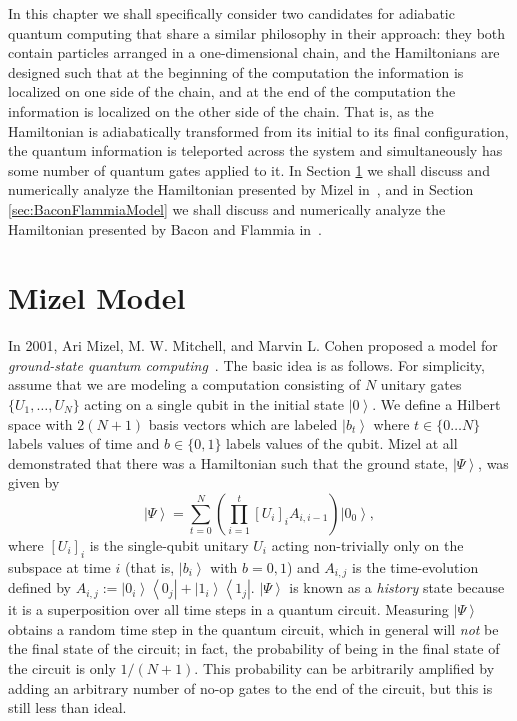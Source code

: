 \documentclass[12pt]{amsbook}
\theoremstyle{plain}
\theoremstyle{definition}
\theoremstyle{remark}
\newcommand{\ket}[1]{\left|#1\right>}
\newcommand{\bra}[1]{\left<#1\right|}
\newcommand{\ketbra}[2]{\ket{#1}\!\!\bra{#2}}
\newcommand{\paren}[1]{\left(#1\right)}
\begin{document}
In this chapter we shall specifically consider two candidates for adiabatic quantum computing that share a similar philosophy in their approach:  they both contain particles arranged in a one-dimensional chain, and the Hamiltonians are designed such that at the beginning of the computation the information is localized on one side of the chain, and at the end of the computation the information is localized on the other side of the chain.  That is, as the Hamiltonian is adiabatically transformed from its initial to its final configuration, the quantum information is teleported across the system and simultaneously has some number of quantum gates applied to it.  In Section \ref{sec:MizelModel} we shall discuss and numerically analyze the Hamiltonian presented by Mizel in~\cite{Mizel2010}, and in Section \ref{sec:BaconFlammiaModel} we shall discuss and numerically analyze the Hamiltonian presented by Bacon and Flammia in~\cite{Bacon2009}.
\section{Mizel Model}
\label{sec:MizelModel}

In 2001, Ari Mizel, M. W. Mitchell, and Marvin L. Cohen proposed a model for \emph{ground-state quantum computing}~\cite{PhysRevA.63.040302}.  The basic idea is as follows.  For simplicity, assume that we are modeling a computation consisting of $N$ unitary gates $\{U_1,\dots,U_N\}$ acting on a single qubit in the initial state $\ket{0}$.  We define a Hilbert space with $2(N+1)$ basis vectors which are labeled $\ket{b_t}$ where $t\in\{0\dots N\}$ labels values of time and $b\in\{0,1\}$ labels values of the qubit.  Mizel at all demonstrated that there was a Hamiltonian such that the ground state, $\ket{\Psi}$, was given by $$\ket{\Psi}=\sum_{t=0}^N \paren{\prod_{i=1}^{t}[U_i]_i A_{i,i-1}}\ket{0_0},$$ where $[U_i]_i$ is the single-qubit unitary $U_i$ acting non-trivially only on the subspace at time $i$ (that is, $\ket{b_i}$ with $b=0,1$) and $A_{i,j}$ is the time-evolution defined by $A_{i,j} := \ketbra{0_i}{0_j} + \ketbra{1_i}{1_j}.$  $\ket{\Psi}$ is known as a \emph{history} state because it is a superposition over all time steps in a quantum circuit.  Measuring $\ket{\Psi}$ obtains a random time step in the quantum circuit, which in general will \emph{not} be the final state of the circuit;  in fact, the probability of being in the final state of the circuit is only $1/(N+1)$.  This probability can be arbitrarily amplified by adding an arbitrary number of no-op gates to the end of the circuit, but this is still less than ideal.
\end{document}
